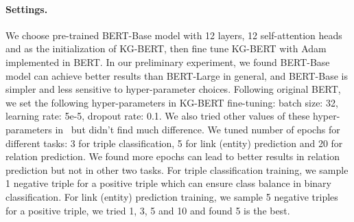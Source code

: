 \documentclass[letterpaper]{article} \usepackage{aaai20}  \usepackage{times}  \usepackage{helvet} \usepackage{courier}  \usepackage[hyphens]{url}  \usepackage{graphicx} \urlstyle{rm} \def\UrlFont{\rm}  \usepackage{graphicx}  \usepackage{amsmath}
\begin{document}
\paragraph{Settings.}
We choose pre-trained BERT-Base model with 12 layers, 12 self-attention heads and  as the initialization of KG-BERT, then fine tune KG-BERT with Adam implemented in BERT. In our preliminary experiment, we found BERT-Base model can achieve better results than BERT-Large in general, and BERT-Base is simpler and less sensitive to hyper-parameter choices. Following original BERT, we set the following hyper-parameters in KG-BERT fine-tuning: batch size: 32, learning rate: 5e-5, dropout rate: 0.1. We also tried other values of these hyper-parameters in~\cite{devlin2019bert} but didn't find much difference. We tuned number of epochs for different tasks: 3 for triple classification, 5 for link (entity) prediction and 20 for relation prediction. We found more epochs can lead to better results in relation prediction but not in other two tasks. For triple classification training, we sample 1 negative triple for a positive triple which can ensure class balance in binary classification. For link (entity) prediction training, we sample 5 negative triples for a positive triple, we tried 1, 3, 5 and 10 and found 5 is the best.
\end{document}

